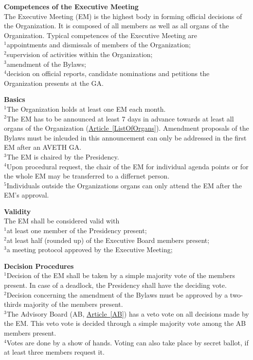 \documentclass[10pt]{article}
\newcounter{qcounter}
\begin{document}
\begin{list}{{\bf Article :~}}{}
\item {\bf Competences of the Executive Meeting}\label{EM}\\
The Executive Meeting (EM) is the highest body in forming official decisions of the Organization. It is composed of all members as well as all organs of the Organization. Typical competences of the Executive Meeting are\\
$^{1}$appointments and dismissals of members of the Organization;\\
$^{2}$supervision of activities within the Organization;\\
$^{3}$amendment of the Bylaws;\\
$^{4}$decision on official reports, candidate nominations and petitions the Organization presents at the GA.\\

\item {\bf Basics}\\
$^{1}$The Organization holds at least one EM each month.\\
$^{2}$The EM has to be announced at least 7 days in advance towards at least all organs of the Organization (\hyperref[ListOfOrgans]{Article~\ref{ListOfOrgans}}). Amendment proposals of the Bylaws must be inlcuded in this announcement can only be addressed in the first EM after an AVETH GA.\\
$^{3}$The EM is chaired by the Presidency.\\
$^{4}$Upon procedural request, the chair of the EM for individual agenda points or for the whole EM may be transferred to a differnet person.\\
$^{5}$Individuals outside the Organizations organs can only attend the EM after the EM's approval. 

\item {\bf Validity}\\
The EM shall be considered valid with\\
$^{1}$at least one member of the Presidency present; \\
$^{2}$at least half (rounded up) of the Executive Board members present; \\
$^{3}$a meeting protocol approved by the Executive Meeting; \\

\item {\bf Decision Procedures}\label{EMDecisionProcedure}\\
$^{1}$Decision of the EM shall be taken by a simple majority vote of the members present. In case of a deadlock, the Presidency shall have the deciding vote.\\
$^{2}$Decision concerning the amendment of the Bylaws must be approved by a two-thirds majority of the members present.\\
$^{3}$The Advisory Board (AB, \hyperref[AB]{Article~\ref{AB}}) has a veto vote on all decisions made by the EM. This veto vote is decided through a simple majority vote among the AB members present. \\
$^{4}$Votes are done by a show of hands. Voting can also take place by secret ballot, if at least three members request it. \\


\end{list}
\end{document}
